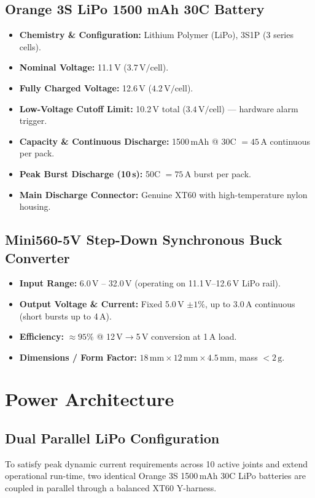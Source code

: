 \documentclass[11pt,a4paper]{article}
\begin{document}
\subsection{Orange 3S LiPo 1500 mAh 30C Battery}
\begin{itemize}[leftmargin=1.5em, itemsep=0.2em]
    \item \textbf{Chemistry \& Configuration:} Lithium Polymer (LiPo), 3S1P (3 series cells).
    \item \textbf{Nominal Voltage:} 11.1\,V ($3.7\,\text{V}/\text{cell}$).
    \item \textbf{Fully Charged Voltage:} 12.6\,V ($4.2\,\text{V}/\text{cell}$).
    \item \textbf{Low-Voltage Cutoff Limit:} 10.2\,V total ($3.4\,\text{V}/\text{cell}$) --- hardware alarm trigger.
    \item \textbf{Capacity \& Continuous Discharge:} 1500\,mAh @ 30C $= 45\,\text{A}$ continuous per pack.
    \item \textbf{Peak Burst Discharge (10\,s):} 50C $= 75\,\text{A}$ burst per pack.
    \item \textbf{Main Discharge Connector:} Genuine XT60 with high-temperature nylon housing.
\end{itemize}

\subsection{Mini560-5V Step-Down Synchronous Buck Converter}
\begin{itemize}[leftmargin=1.5em, itemsep=0.2em]
    \item \textbf{Input Range:} 6.0\,V -- 32.0\,V (operating on 11.1\,V--12.6\,V LiPo rail).
    \item \textbf{Output Voltage \& Current:} Fixed 5.0\,V $\pm 1\%$, up to 3.0\,A continuous (short bursts up to 4\,A).
    \item \textbf{Efficiency:} $\approx 95\%$ @ 12\,V$\to$5\,V conversion at 1\,A load.
    \item \textbf{Dimensions / Form Factor:} $18\,\text{mm} \times 12\,\text{mm} \times 4.5\,\text{mm}$, mass $<2\,\text{g}$.
\end{itemize}

\section{Power Architecture}

\subsection{Dual Parallel LiPo Configuration}
To satisfy peak dynamic current requirements across 10 active joints and extend operational run-time, two identical Orange 3S 1500\,mAh 30C LiPo batteries are coupled in parallel through a balanced XT60 Y-harness.
\end{document}
